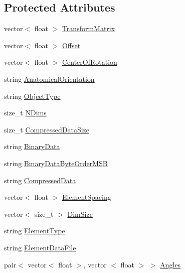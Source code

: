 \subsection*{\-Protected \-Attributes}
\begin{DoxyCompactItemize}
\item 
vector$<$ float $>$ \hyperlink{classMhd_1_1MhdOrientation_aa070162e37053f01a4b2b7d51a15df05}{\-Transform\-Matrix}
\item 
vector$<$ float $>$ \hyperlink{classMhd_1_1MhdOrientation_a07437846f5a5cda783205a628edbcc3f}{\-Offset}
\item 
vector$<$ float $>$ \hyperlink{classMhd_1_1MhdOrientation_aa45e38464ed4f9300c0ee36c8c878142}{\-Center\-Of\-Rotation}
\item 
string \hyperlink{classMhd_1_1MhdOrientation_aa4d1901d0fbfee2d26c1d53c8d6a3d05}{\-Anatomical\-Orientation}
\item 
string \hyperlink{classMhd_1_1MhdOrientation_a46fe7ec6720e2e70f938d62e7f11f9f7}{\-Object\-Type}
\item 
size\-\_\-t \hyperlink{classMhd_1_1MhdOrientation_a78ba0dc5c42d718a8e87284488f20bee}{\-N\-Dims}
\item 
size\-\_\-t \hyperlink{classMhd_1_1MhdOrientation_a18d61cf0ac99da50f7826f39965a07c8}{\-Compressed\-Data\-Size}
\item 
string \hyperlink{classMhd_1_1MhdOrientation_ac706a5b03a026b8017bead638210e802}{\-Binary\-Data}
\item 
string \hyperlink{classMhd_1_1MhdOrientation_ab8cf58d0250c137bfb94698ff9f0a277}{\-Binary\-Data\-Byte\-Order\-M\-S\-B}
\item 
string \hyperlink{classMhd_1_1MhdOrientation_adca76072f769ef254b2c2dfddd431757}{\-Compressed\-Data}
\item 
vector$<$ float $>$ \hyperlink{classMhd_1_1MhdOrientation_a6a36dc309ac8b0e3d9135908b50aaac1}{\-Element\-Spacing}
\item 
vector$<$ size\-\_\-t $>$ \hyperlink{classMhd_1_1MhdOrientation_af457d4ec1dc3b11e1c8fa5d265f2ef45}{\-Dim\-Size}
\item 
string \hyperlink{classMhd_1_1MhdOrientation_a474a41869616c9b3128d53b9c244c82d}{\-Element\-Type}
\item 
string \hyperlink{classMhd_1_1MhdOrientation_aed4d5737448eb7455da9f64ede632efe}{\-Element\-Data\-File}
\item 
pair$<$ vector$<$ float $>$, vector\*
$<$ float $>$ $>$ \hyperlink{classMhd_1_1MhdOrientation_aeb4a41e8433c3990a92a65ac2b121a1a}{\-Angles}
\end{DoxyCompactItemize}
